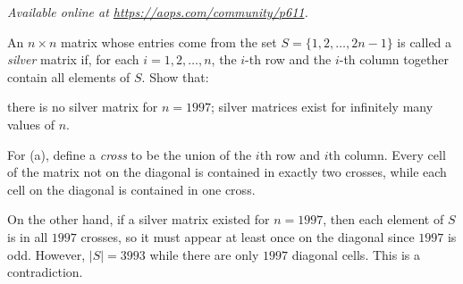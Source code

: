 \textsl{Available online at \url{https://aops.com/community/p611}.}
\begin{mdframed}[style=mdpurplebox,frametitle={Problem statement}]
An $n \times n$ matrix whose entries come
from the set $S = \{1, 2, \dots , 2n - 1\}$
is called a \emph{silver} matrix if,
for each $i = 1, 2, \dots , n$,
the $i$-th row and the $i$-th column together
contain all elements of $S$. Show that:
\begin{enumerate}[(a)]
\ii there is no silver matrix for $n = 1997$;
\ii silver matrices exist for infinitely many values of $n$.
\end{enumerate}
\end{mdframed}
For (a), define a \emph{cross} to be the union
of the $i$th row and $i$th column.
Every cell of the matrix not on the diagonal is
contained in exactly two crosses,
while each cell on the diagonal is contained in one cross.

On the other hand, if a silver matrix existed for $n=1997$,
then each element of $S$ is in all $1997$ crosses,
so it must appear at least once on the diagonal since $1997$ is odd.
However, $|S| = 3993$ while there are only $1997$ diagonal cells.
This is a contradiction.

